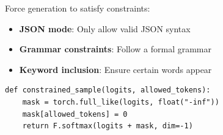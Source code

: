Force generation to satisfy constraints:

\begin{itemize}
    \item \textbf{JSON mode}: Only allow valid JSON syntax
    \item \textbf{Grammar constraints}: Follow a formal grammar
    \item \textbf{Keyword inclusion}: Ensure certain words appear
\end{itemize}

\begin{lstlisting}[style=python]
def constrained_sample(logits, allowed_tokens):
    mask = torch.full_like(logits, float("-inf"))
    mask[allowed_tokens] = 0
    return F.softmax(logits + mask, dim=-1)
\end{lstlisting}
